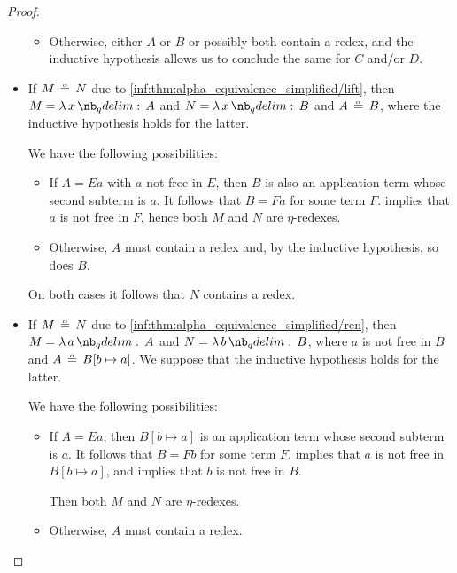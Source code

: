 \begin{proof}
\begin{itemize}
\begin{itemize}
      \item Otherwise, either \( A \) or \( B \) or possibly both contain a redex, and the inductive hypothesis allows us to conclude the same for \( C \) and/or \( D \).
    \end{itemize}

    \item If \( M \aequiv N \) due to \ref{inf:thm:alpha_equivalence_simplified/lift}, then \( M = \qabs x A \) and \( N = \qabs x B \) and \( A \aequiv B \), where the inductive hypothesis holds for the latter.

    We have the following possibilities:
    \begin{itemize}
      \item If \( A = Ea \) with \( a \) not free in \( E \), then \( B \) is also an application term whose second subterm is \( a \). It follows that \( B = Fa \) for some term \( F \).  implies that \( a \) is not free in \( F \), hence both \( M \) and \( N \) are \( \eta \)-redexes.

      \item Otherwise, \( A \) must contain a redex and, by the inductive hypothesis, so does \( B \).
    \end{itemize}

    On both cases it follows that \( N \) contains a redex.

    \item If \( M \aequiv N \) due to \ref{inf:thm:alpha_equivalence_simplified/ren}, then \( M = \qabs a A \) and \( N = \qabs b B \), where \( a \) is not free in \( B \) and \( A \aequiv B[b \mapsto a] \). We suppose that the inductive hypothesis holds for the latter.

    We have the following possibilities:
    \begin{itemize}
      \item If \( A = Ea \), then \( B[b \mapsto a] \) is an application term whose second subterm is \( a \). It follows that \( B = Fb \) for some term \( F \).  implies that \( a \) is not free in \( B[b \mapsto a] \), and  implies that \( b \) is not free in \( B \).

      Then both \( M \) and \( N \) are \( \eta \)-redexes.

      \item Otherwise, \( A \) must contain a redex.


\end{itemize}
\end{itemize}
\end{proof}

